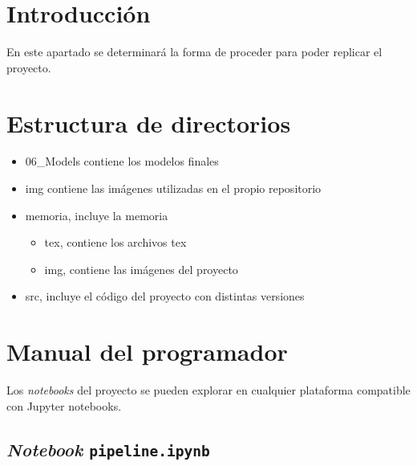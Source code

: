 
\section{Introducción}

En este apartado se determinará la forma de proceder para poder replicar el proyecto.

\section{Estructura de directorios}

\begin{itemize}
    \item 06\_Models contiene los modelos finales
    \item img contiene las imágenes utilizadas en el propio repositorio
    \item memoria, incluye la memoria
    \begin{itemize}
        \item tex, contiene los archivos tex
        \item img, contiene las imágenes del proyecto
    \end{itemize}
        \item src, incluye el código del proyecto con distintas versiones
\end{itemize}

\section{Manual del programador}


Los \textit{notebooks} del proyecto se pueden explorar en cualquier plataforma compatible con Jupyter notebooks.

\subsection{\textit{Notebook} \texttt{pipeline.ipynb}} \label{anx:pipeline}

